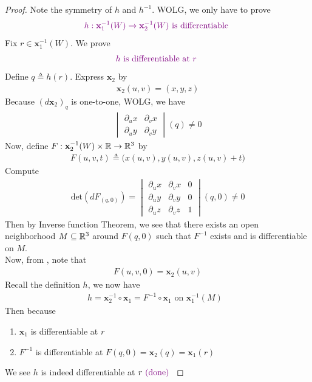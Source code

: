 \documentclass{report}
\begin{document}
\begin{proof}
Note the symmetry of $h$ and $h^{-1}$. WOLG, we only have to prove 
\begin{align*}
\textcolor{violet}{h:\textbf{x}_1^{-1}(W)\rightarrow \textbf{x}_2^{-1}(W)\text{ is differentiable }}
\end{align*}
Fix $r \in \textbf{x}_1^{-1}(W)$. We prove 
\begin{align*}
  \textcolor{violet}{h\text{ is differentiable at $r$ }}
\end{align*}
Define $q\triangleq h(r)$. Express $\textbf{x}_2$ by 
\begin{align*}
\textbf{x}_2(u,v)=(x,y,z)
\end{align*}
Because $(d\textbf{x}_2)_q$ is one-to-one, WOLG, we have 
\begin{align*}
\begin{vmatrix} 
  \partial_u x & \partial_v x\\
  \partial_u y & \partial_v y
\end{vmatrix}(q)\neq 0
\end{align*}
Now, define $F:\textbf{x}_2^{-1}(W)\times \mathbb{R}\rightarrow \mathbb{R}^3$ by  
\begin{align}
\label{CC1}
F(u,v,t)\triangleq  \Big(x(u,v),y(u,v),z(u,v)+t \Big)
\end{align}
Compute 
\begin{align*}
  \text{det}(dF_{(q,0)})=\begin{vmatrix}
  \partial_u x & \partial_v x & 0\\
  \partial_u y & \partial_v y & 0\\
  \partial_u z & \partial_v z & 1 
\end{vmatrix}(q,0)\neq 0 
\end{align*}
Then by Inverse function Theorem, we see that there exists an open neighborhood $M\subseteq \mathbb{R}^3$ around $F(q,0)$ such that $F^{-1}$ exists and is differentiable on $M$.\\

Now, from , note that 
\begin{align*}
F(u,v,0)=\textbf{x}_2(u,v)
\end{align*}
Recall the definition $h$, we now have 
\begin{align*}
h=\textbf{x}_2^{-1}\circ \textbf{x}_1=F^{-1}\circ \textbf{x}_1\text{ on $\textbf{x}_1^{-1}(M)$ }
\end{align*}
Then because 
\begin{enumerate}[label=(\alph*)]
  \item $\textbf{x}_1$ is differentiable at $r$ 
   \item $F^{-1}$ is differentiable at $F(q,0)=\textbf{x}_2(q)=\textbf{x}_1(r)$ 
\end{enumerate}
We see $h$ is indeed differentiable at $r\textcolor{violet}{\text{ (done) }}$
\end{proof}
\end{document}
